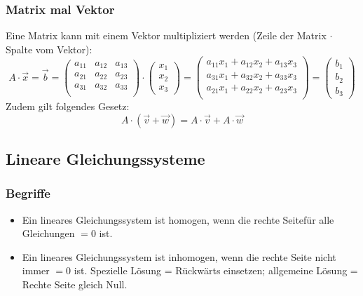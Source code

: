 \subsubsection{Matrix mal Vektor}
Eine Matrix kann mit einem Vektor multipliziert werden (Zeile der Matrix $\cdot$
Spalte vom Vektor):
\[ A \cdot \vec x = \vec b = \begin {pmatrix}
  a_{11} & a_{12} & a_{13} \\
  a_{21} & a_{22} & a_{23} \\
  a_{31} & a_{32} & a_{33} \\
\end {pmatrix} \cdot
  \left( \begin {array} {c} x_1 \\ x_2 \\ x_3 \end {array} \right) = 
  \left( \begin {array} {c}
            a_{11}x_1 + a_{12}x_2 + a_{13}x_3 \\
            a_{31}x_1 + a_{32}x_2 + a_{33}x_3 \\
            a_{21}x_1 + a_{22}x_2 + a_{23}x_3 \\
         \end {array}
  \right) =
  \left( \begin {array} {c} b_1 \\ b_2 \\ b_3 \end {array} \right)
     \]
Zudem gilt folgendes Gesetz:
\[ A \cdot (\vec v + \vec w) = A \cdot \vec v + A \cdot \vec w \]

\subsection{Lineare Gleichungssysteme}
\subsubsection{Begriffe}
\begin{itemize}
  \item Ein lineares Gleichungssystem ist homogen, wenn die rechte Seitefür alle Gleichungen $= 0$ ist.
  \item Ein lineares Gleichungssystem ist inhomogen, wenn die rechte
    Seite nicht immer $= 0$ ist. Spezielle Lösung = Rückwärts einsetzen;
    allgemeine Lösung = Rechte Seite gleich Null.
\end{itemize}

